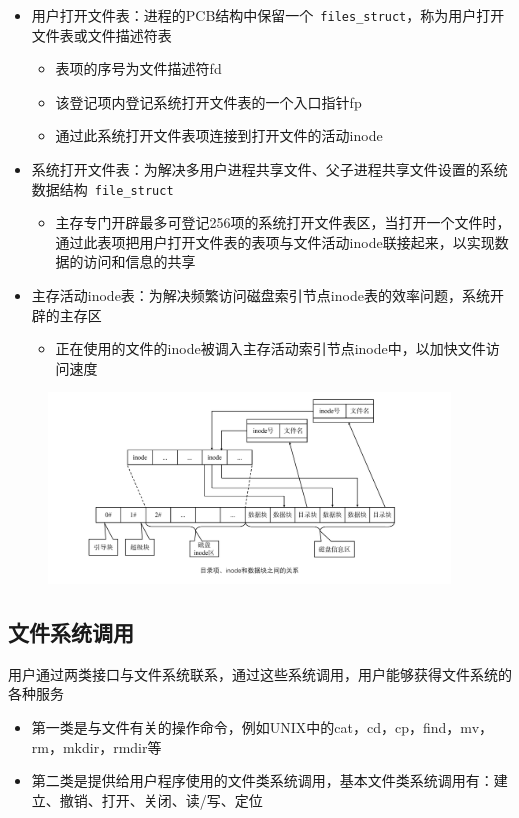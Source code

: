 \documentclass[cs4size,a4paper,10pt]{ctexart}
\begin{document}
	\begin{itemize}
		\item 用户打开文件表：进程的PCB结构中保留一个\ \verb|files_struct|，称为用户打开文件表或文件描述符表
		\begin{itemize}
			\item 表项的序号为文件描述符fd
			\item 该登记项内登记系统打开文件表的一个入口指针fp
			\item 通过此系统打开文件表项连接到打开文件的活动inode
		\end{itemize}
		\item 系统打开文件表：为解决多用户进程共享文件、父子进程共享文件设置的系统数据结构\ \verb|file_struct|
		\begin{itemize}
			\item 主存专门开辟最多可登记256项的系统打开文件表区，当打开一个文件时，通过此表项把用户打开文件表的表项与文件活动inode联接起来，以实现数据的访问和信息的共享
		\end{itemize}
		\item 主存活动inode表：为解决频繁访问磁盘索引节点inode表的效率问题，系统开辟的主存区
		\begin{itemize}
			\item 正在使用的文件的inode被调入主存活动索引节点inode中，以加快文件访问速度
		\end{itemize}
	\end{itemize}

	\begin{figure}[H]
		\centering
		\includegraphics[width=0.95\textwidth]{img/目录项、inode和数据块之间的关系.pdf}
	\end{figure}

	\subsection{文件系统调用}
	用户通过两类接口与文件系统联系，通过这些系统调用，用户能够获得文件系统的各种服务
	\begin{itemize}
		\item 第一类是与文件有关的操作命令，例如UNIX中的cat，cd，cp，find，mv，rm，mkdir，rmdir等
		\item 第二类是提供给用户程序使用的文件类系统调用，基本文件类系统调用有：建立、撤销、打开、关闭、读/写、定位
	\end{itemize}
\end{document}
